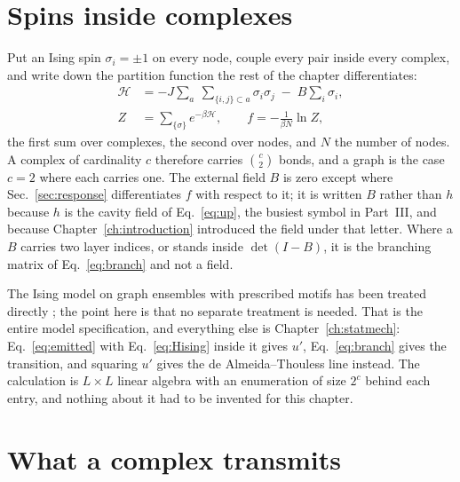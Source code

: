 \section{Spins inside complexes}
\label{sec:spins}

Put an Ising spin $\sigma_{i}=\pm1$ on every node, couple every pair inside
every complex, and write down the partition function the rest of the chapter
differentiates:
\begin{equation}
  \begin{aligned}
    \mathcal{H}&=-J\sum_{a}\ \sum_{\{i,j\}\subset a}\sigma_{i}\sigma_{j}
              \;-\;B\sum_{i}\sigma_{i},\\
    Z&=\sum_{\{\sigma\}}e^{-\beta\mathcal{H}},
    \qquad
    f=-\frac{1}{\beta N}\ln Z,
  \end{aligned}
  \label{eq:Hising}
\end{equation}
the first sum over complexes, the second over nodes, and $N$ the number of
nodes. A complex of cardinality $c$ therefore carries $\binom{c}{2}$ bonds,
and a graph is the case $c=2$ where each carries one. The external field $B$ is
zero except where Sec.~\ref{sec:response} differentiates $f$ with respect to
it; it is written $B$ rather than $h$ because $h$ is the cavity field of
Eq.~\eqref{eq:up}, the busiest symbol in Part~III, and because
Chapter~\ref{ch:introduction} introduced the field under that letter.
Where a $B$ carries two layer indices, or stands inside $\det(I-B)$, it is
the branching matrix of Eq.~\eqref{eq:branch} and not a field.

The Ising model on graph ensembles with prescribed motifs has been treated
directly \citep{yoon2011}; the point here is that no separate treatment is
needed. That is the entire model specification, and everything else is
Chapter~\ref{ch:statmech}: Eq.~\eqref{eq:emitted} with Eq.~\eqref{eq:Hising}
inside it gives $u'$, Eq.~\eqref{eq:branch} gives the transition, and squaring
$u'$ gives the de Almeida--Thouless line instead. The calculation is $L\times L$
linear algebra with an enumeration of size $2^{c}$ behind each entry, and
nothing about it had to be invented for this chapter.

\section{What a complex transmits}
\label{sec:transmits}

